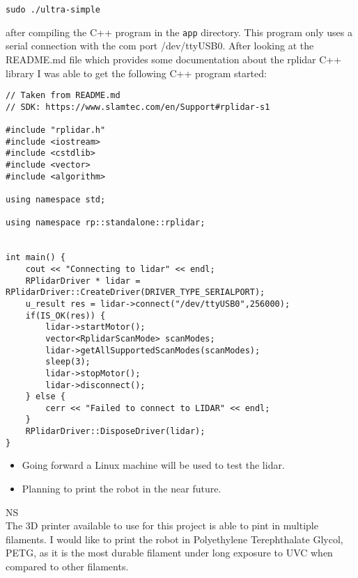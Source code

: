 \documentclass[fontsize=11pt, %
                             paper=a4, %
                             twoside, %
                             captions=tableheading,
                             index=totoc,
                             hyperref]{labbook}
\begin{document}
\begin{addmargin}[0cm]{0cm}
\begin{Verbatim}
sudo ./ultra-simple
\end{Verbatim}
after compiling the C++ program in the \texttt{app} directory. This program only uses a serial connection with the com port /dev/ttyUSB$0$. After looking at the README.md file which provides some documentation about the rplidar C++ library I was able to get the following C++ program started:
\begin{Verbatim}
// Taken from README.md
// SDK: https://www.slamtec.com/en/Support#rplidar-s1

#include "rplidar.h"
#include <iostream>
#include <cstdlib>
#include <vector>
#include <algorithm>

using namespace std;

using namespace rp::standalone::rplidar;


int main() {
    cout << "Connecting to lidar" << endl;
	RPlidarDriver * lidar = RPlidarDriver::CreateDriver(DRIVER_TYPE_SERIALPORT);
    u_result res = lidar->connect("/dev/ttyUSB0",256000);
    if(IS_OK(res)) {
        lidar->startMotor();
        vector<RplidarScanMode> scanModes;
        lidar->getAllSupportedScanModes(scanModes);
        sleep(3);
        lidar->stopMotor();
        lidar->disconnect();
    } else {
        cerr << "Failed to connect to LIDAR" << endl;
    }
    RPlidarDriver::DisposeDriver(lidar);    
}
\end{Verbatim}

\begin{itemize}
\item Going forward a Linux machine will be used to test the lidar.
\item Planning to print the robot in the near future.
\end{itemize}
NS\\
The 3D printer available to use for this project is able to pint in multiple filaments. I would like to print the robot in Polyethylene Terephthalate Glycol, PETG, as it is the most durable filament under long exposure to UVC when compared to other filaments. 




\end{addmargin} 





\end{document}
